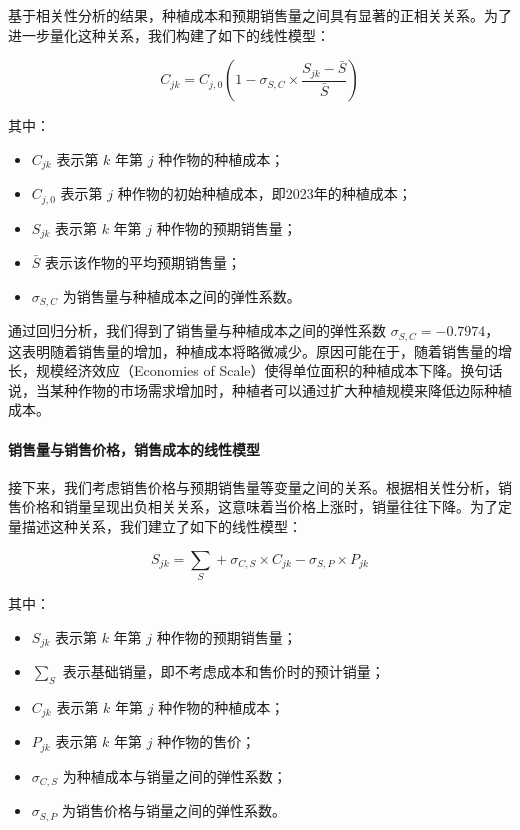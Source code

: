 \documentclass[12pt,a4paper]{nmmcm}
\begin{document}
基于相关性分析的结果，种植成本和预期销售量之间具有显著的正相关关系。为了进一步量化这种关系，我们构建了如下的线性模型：

\[
  C_{jk} = C_{j,0} \left(1 - \sigma_{S,C} \times \frac{S_{jk} - \bar{S}}{\bar{S}} \right)
\]

其中：
\begin{itemize}
  \item $C_{jk}$ 表示第 $k$ 年第 $j$ 种作物的种植成本；
  \item $C_{j,0}$ 表示第 $j$ 种作物的初始种植成本，即2023年的种植成本；
  \item $S_{jk}$ 表示第 $k$ 年第 $j$ 种作物的预期销售量；
  \item $\bar{S}$ 表示该作物的平均预期销售量；
  \item $\sigma_{S,C}$ 为销售量与种植成本之间的弹性系数。
\end{itemize}

通过回归分析，我们得到了销售量与种植成本之间的弹性系数 $\sigma_{S,C} = -0.7974$，这表明随着销售量的增加，种植成本将略微减少。原因可能在于，随着销售量的增长，规模经济效应（Economies of Scale）使得单位面积的种植成本下降。换句话说，当某种作物的市场需求增加时，种植者可以通过扩大种植规模来降低边际种植成本。

\paragraph{销售量与销售价格，销售成本的线性模型}

接下来，我们考虑销售价格与预期销售量等变量之间的关系。根据相关性分析，销售价格和销量呈现出负相关关系，这意味着当价格上涨时，销量往往下降。为了定量描述这种关系，我们建立了如下的线性模型：

\[
  S_{jk} = \sum_S + \sigma_{C,S} \times C_{jk} - \sigma_{S,P} \times P_{jk}
\]

其中：
\begin{itemize}
  \item $S_{jk}$ 表示第 $k$ 年第 $j$ 种作物的预期销售量；
  \item $\sum_S$ 表示基础销量，即不考虑成本和售价时的预计销量；
  \item $C_{jk}$ 表示第 $k$ 年第 $j$ 种作物的种植成本；
  \item $P_{jk}$ 表示第 $k$ 年第 $j$ 种作物的售价；
  \item $\sigma_{C,S}$ 为种植成本与销量之间的弹性系数；
  \item $\sigma_{S,P}$ 为销售价格与销量之间的弹性系数。
\end{itemize}
\end{document}
